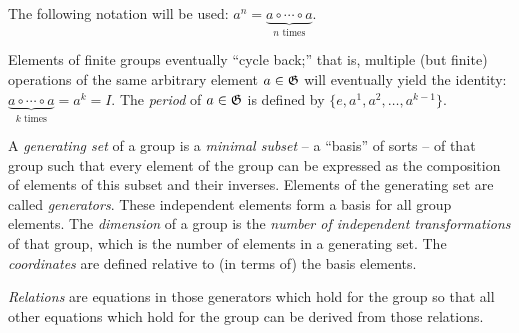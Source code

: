 The following notation will be used: $a^n = \underbrace{a \circ \cdots \circ a}_{n \text{ times}}$.

Elements of finite groups eventually ``cycle back;'' that is, multiple (but finite) operations of the same arbitrary element $a \in {\frak G}$ will eventually yield the identity:
$\underbrace{a \circ \cdots \circ a}_{k \text{ times}}= a^k=I$.
The {\em period} of $a \in {\frak G}$ is defined by
$\{e,a^1,a^2,\ldots , a^{k-1}\}$.

A {\em generating set}
of a group is a {\em minimal subset} -- a ``basis'' of sorts -- of that group
such that every element of the group can be expressed as the composition of elements of this subset and their inverses.
Elements of the generating set are called {\em generators}.
These independent elements form a basis for all group elements.
The {\em dimension} of a group is the {\em number of independent transformations} of that group,
which is the number of elements in a generating set.
The {\em coordinates} are defined relative to (in terms of) the basis elements.

{\em Relations}
 are equations in those generators which hold for the group so that all other equations which hold for the group can be derived from those relations.





